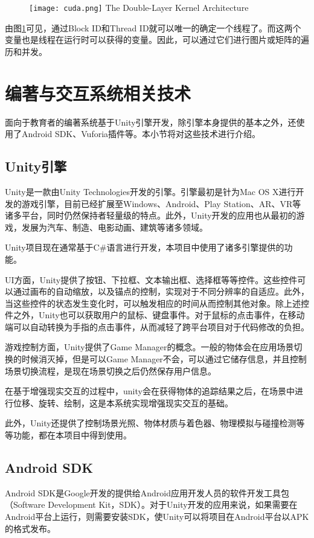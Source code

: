 \begin{figure}[!htp]
  \centering
  \texttt{[image: cuda.png]}
    {The Double-Layer Kernel Architecture }
 \label{fig:ceda}
\end{figure}

由图\ref{fig:ceda}可见，通过Block ID和Thread ID就可以唯一的确定一个线程了。而这两个变量也是线程在运行时可以获得的变量。因此，可以通过它们进行图片或矩阵的遍历和并发。

\section{编著与交互系统相关技术}
面向于教育者的编著系统基于Unity引擎开发，除引擎本身提供的基本之外，还使用了Android SDK、Vuforia插件等。本小节将对这些技术进行介绍。

\subsection{Unity引擎}
Unity\cite{Unity}是一款由Unity Technologies开发的引擎。引擎最初是针为Mac OS X进行开发的游戏引擎，目前已经扩展至Windows、Android、Play Station、AR、VR等诸多平台，同时仍然保持者轻量级的特点。此外，Unity开发的应用也从最初的游戏，发展为汽车、制造、电影动画、建筑等诸多领域。

Unity项目现在通常基于C\#语言进行开发，本项目中使用了诸多引擎提供的功能。
	
UI方面，Unity提供了按钮、下拉框、文本输出框、选择框等等控件。这些控件可以通过画布的自动缩放，以及锚点的控制，实现对于不同分辨率的自适应。此外，当这些控件的状态发生变化时，可以触发相应的时间从而控制其他对象。除上述控件之外，Unity也可以获取用户的鼠标、键盘事件。对于鼠标的点击事件，在移动端可以自动转换为手指的点击事件，从而减轻了跨平台项目对于代码修改的负担。

游戏控制方面，Unity提供了Game Manager的概念。一般的物体会在应用场景切换的时候消灭掉，但是可以Game Manager不会，可以通过它储存信息，并且控制场景切换流程，是现在场景切换之后仍然保存用户信息。

在基于增强现实交互的过程中，unity会在获得物体的追踪结果之后，在场景中进行位移、旋转、绘制，这是本系统实现增强现实交互的基础。

此外，Unity还提供了控制场景光照、物体材质与着色器、物理模拟与碰撞检测等等功能，都在本项目中得到使用。

\subsection{Android SDK}
Android SDK\cite{Android}是Google开发的提供给Android应用开发人员的软件开发工具包（Software Development Kit，SDK）。对于Unity开发的应用来说，如果需要在Android平台上运行，则需要安装SDK，使Unity可以将项目在Android平台以APK的格式发布。

